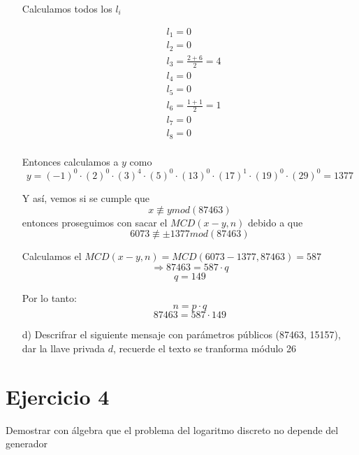 \documentclass[12pt, letterpaper]{article}
\begin{document}
\begin{itemize}
Calculamos todos los $l_i$

\begin{equation*}
\begin{split}
&l_1 = 0\\
&l_2 = 0\\
&l_3 = \frac{2+6}{2} = 4\\
&l_4 = 0\\
&l_5 = 0\\
&l_6 = \frac{1+1}{2} = 1\\
&l_7 = 0\\
&l_8 = 0\\
\end{split}
\end{equation*}

Entonces calculamos a $y$ como\[y = (-1)^0\cdot(2)^0\cdot(3)^4\cdot(5)^0\cdot(13)^0\cdot(17)^1\cdot(19)^0\cdot(29)^0 = 1377\]

Y así, vemos si se cumple que $$x \not \equiv y mod (87463)$$ entonces proseguimos con sacar el $MCD(x-y, n)$ debido a que $$6073 \not \equiv \pm 1377 mod (87463)$$

Calculamos el $MCD(x-y, n) = MCD(6073-1377, 87463) = 587$
\[\Rightarrow 87463 = 587 \cdot q\]
\[q = 149\]

Por lo tanto:
\[n = p \cdot q\]
\[ 87463 = 587 \cdot 149\]


\item[d)] Descrifrar el siguiente mensaje con parámetros públicos (87463, 15157), dar la llave privada $d$, recuerde el texto se tranforma módulo 26
\end{itemize}

\section*{Ejercicio 4}
Demostrar con álgebra que el problema del logaritmo discreto no depende del generador
\end{document}
